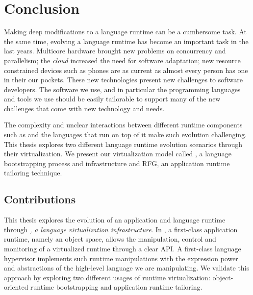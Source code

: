 
\chapter{Conclusion}
\minitoc
\introduction

Making deep modifications to a language runtime can be a cumbersome task.
At the same time, evolving a language runtime has become an important task in the last years. Multicore hardware brought new problems on concurrency and parallelism; the \emph{cloud} increased the need for software adaptation; new resource constrained devices such as phones are as current as almost every person has one in their our pockets. These new technologies present new challenges to software developers. The software we use, and in particular the programming languages and tools we use should be easily tailorable to support many of the new challenges that come with new technology and needs.

The complexity and unclear interactions between different runtime components such as \VMs and the languages that run on top of it make such evolution challenging. This thesis explores two different language runtime evolution scenarios through their virtualization. We present our virtualization model called \Vtt, a language bootstrapping process and infrastructure and RFG, an application runtime tailoring technique.

\section{Contributions}

This thesis explores the evolution of an application and language runtime through \emph{\Vtt, a language virtualization infrastructure}. In \Vtt, a first-class application runtime, namely an object space, allows the manipulation, control and monitoring of a virtualized runtime through a clear API. A first-class language hypervisor implements such runtime manipulations with the expression power and abstractions of the high-level language we are manipulating. We validate this approach by exploring two different usages of runtime virtualization: object-oriented runtime bootstrapping and application runtime tailoring.

